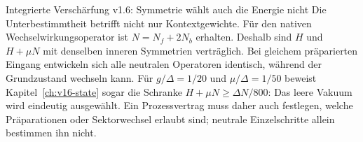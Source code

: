 \begin{grenze}{Integrierte Verschärfung v1.6: Symmetrie wählt auch die Energie nicht}
Die Unterbestimmtheit betrifft nicht nur Kontextgewichte. Für den nativen Wechselwirkungsoperator ist $N=N_f+2N_b$ erhalten. Deshalb sind $H$ und $H+\mu N$ mit denselben inneren Symmetrien verträglich. Bei gleichem präparierten Eingang entwickeln sich alle neutralen Operatoren identisch, während der Grundzustand wechseln kann. Für $g/\Delta=1/20$ und $\mu/\Delta=1/50$ beweist Kapitel~\ref{ch:v16-state} sogar die Schranke $H+\mu N\ge\Delta N/800$: Das leere Vakuum wird eindeutig ausgewählt. Ein Prozessvertrag muss daher auch festlegen, welche Präparationen oder Sektorwechsel erlaubt sind; neutrale Einzelschritte allein bestimmen ihn nicht.
\end{grenze}
